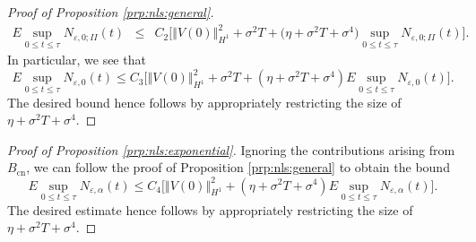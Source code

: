 \documentclass[10pt]{articleHJ}
\newcommand{\e}{\ensuremath{\varepsilon}}
\newcommand{\norm}[1]{\left\Vert#1\right\Vert}		%
\numberwithin{equation}{section}
\begin{document}
\begin{proof}[Proof of Proposition \ref{prp:nls:general}]
\begin{equation}
\begin{array}{lcl}
E \sup_{0\le t \le \tau} N_{\e,0;II}(t)
& \le &
C_2 \big[ %
    \norm{V(0)}_{H^1}^2
    + \sigma^2T
  + \Big( \eta
  + \sigma^2 T + \sigma^4 \Big) \sup_{0\le t \le \tau}
    N_{\e,0;II}(t)
\big].
\end{array}
\end{equation}
In particular, we see that
\begin{equation}
E \sup_{0 \le t \le \tau} N_{\e,0}(t)
\le C_3 \big[ %
  \norm{V(0)}_{H^1}^2
  + \sigma^2 T
  + (\eta + \sigma^2 T + \sigma^4)
      E \sup_{0 \le t \le \tau} N_{\e,0}(t)
\big] .
\end{equation}
The desired bound hence follows
by appropriately restricting the size of
$\eta + \sigma^2 T + \sigma^4$.
\end{proof}

\begin{proof}[Proof of Proposition \ref{prp:nls:exponential}]
Ignoring the contributions
arising from $B_{\mathrm{cn}}$,
we can follow the proof of
Proposition \ref{prp:nls:general}
to obtain the bound
\begin{equation}
E \sup_{0 \le t \le \tau} N_{\e,\alpha}( t)
\le C_4 \big[   %
  \norm{V(0)}_{H^1}^2
  + (\eta + \sigma^2 T + \sigma^4)
      E \sup_{0 \le t \le \tau} N_{\e,\alpha}(t)
  \big].
\end{equation}
The desired estimate hence follows
by appropriately restricting the size of
$\eta + \sigma^2 T + \sigma^4$.
\end{proof}





\end{document}
